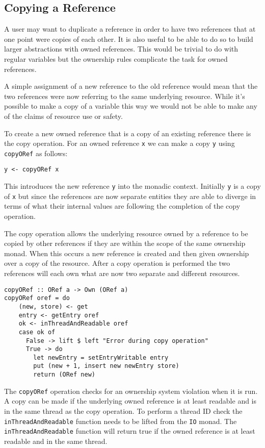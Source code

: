 \documentclass[onehalf,11pt]{beavtex}
\begin{document}
\subsection{Copying a Reference}

A user may want to duplicate a reference in order to have two references
that at one point were copies of each other. It is also useful to
be able to do so to build larger abstractions with owned references.
This would be trivial to do with regular variables but the ownership rules
complicate the task for owned references.

A simple assignment of a new reference to the old reference would mean that
the two references were now referring to the same underlying resource. While
it's possible to make a copy of a variable this way we would not be able to
make any of the claims of resource use or safety.

To create a new owned reference that is a copy of an existing reference
there is the copy operation. For an owned reference \texttt{x} we can make
a copy \texttt{y} using \texttt{copyORef} as follows:

\begin{verbatim}
y <- copyORef x
\end{verbatim}

This introduces the new reference \texttt{y} into the monadic context. Initially
\texttt{y} is a copy of \texttt{x} but since the references are now separate
entities they are able to diverge in terms of what their internal
values are following the completion of the copy operation.

The copy operation allows the underlying resource owned by a reference to be
copied by other references if they are within the scope of the same ownership
monad.
When this occurs a new reference is created and then given ownership over a
copy of the resource.
After a copy operation is performed the two references will each own what are
now two separate and different resources.

\begin{verbatim}
copyORef :: ORef a -> Own (ORef a)
copyORef oref = do
    (new, store) <- get
    entry <- getEntry oref
    ok <- inThreadAndReadable oref
    case ok of
      False -> lift $ left "Error during copy operation"
      True -> do
        let newEntry = setEntryWritable entry
        put (new + 1, insert new newEntry store)
        return (ORef new)
\end{verbatim}

The \texttt{copyORef} operation checks for an ownership system violation when
it is run.
A copy can be made if the underlying owned reference is at least readable and
is in the same thread as the copy operation.
To perform a thread ID check the \texttt{inThreadAndReadable} function
needs to be lifted from the \texttt{IO} monad.
The \texttt{inThreadAndReadable} function will return true if the owned reference
is at least readable and in the same thread.
\end{document}
